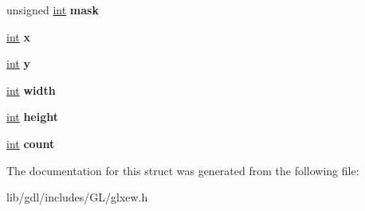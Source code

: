 \begin{DoxyCompactItemize}
\item 
\hypertarget{struct_g_l_x_buffer_clobber_event_s_g_i_x_a74b4ad1ad3cac011001151411f621da1}{}unsigned \hyperlink{_s_d_l__thread_8h_a6a64f9be4433e4de6e2f2f548cf3c08e}{int} {\bfseries mask}\label{struct_g_l_x_buffer_clobber_event_s_g_i_x_a74b4ad1ad3cac011001151411f621da1}

\item 
\hypertarget{struct_g_l_x_buffer_clobber_event_s_g_i_x_a5118d48c3c8d5253d39922b5014b52ff}{}\hyperlink{_s_d_l__thread_8h_a6a64f9be4433e4de6e2f2f548cf3c08e}{int} {\bfseries x}\label{struct_g_l_x_buffer_clobber_event_s_g_i_x_a5118d48c3c8d5253d39922b5014b52ff}

\item 
\hypertarget{struct_g_l_x_buffer_clobber_event_s_g_i_x_aef21efa11558a5b67861f96471c56003}{}\hyperlink{_s_d_l__thread_8h_a6a64f9be4433e4de6e2f2f548cf3c08e}{int} {\bfseries y}\label{struct_g_l_x_buffer_clobber_event_s_g_i_x_aef21efa11558a5b67861f96471c56003}

\item 
\hypertarget{struct_g_l_x_buffer_clobber_event_s_g_i_x_adad23535733161528427584a42bfc6eb}{}\hyperlink{_s_d_l__thread_8h_a6a64f9be4433e4de6e2f2f548cf3c08e}{int} {\bfseries width}\label{struct_g_l_x_buffer_clobber_event_s_g_i_x_adad23535733161528427584a42bfc6eb}

\item 
\hypertarget{struct_g_l_x_buffer_clobber_event_s_g_i_x_a7838dbabb76c22aa8241310a3f2363ea}{}\hyperlink{_s_d_l__thread_8h_a6a64f9be4433e4de6e2f2f548cf3c08e}{int} {\bfseries height}\label{struct_g_l_x_buffer_clobber_event_s_g_i_x_a7838dbabb76c22aa8241310a3f2363ea}

\item 
\hypertarget{struct_g_l_x_buffer_clobber_event_s_g_i_x_ad8f4f0aae058e0a1ff542679823e37a9}{}\hyperlink{_s_d_l__thread_8h_a6a64f9be4433e4de6e2f2f548cf3c08e}{int} {\bfseries count}\label{struct_g_l_x_buffer_clobber_event_s_g_i_x_ad8f4f0aae058e0a1ff542679823e37a9}

\end{DoxyCompactItemize}


The documentation for this struct was generated from the following file\+:\begin{DoxyCompactItemize}
\item 
lib/gdl/includes/\+G\+L/glxew.\+h\end{DoxyCompactItemize}
